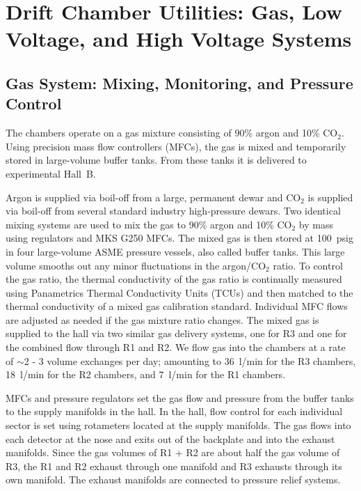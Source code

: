 \section{Drift Chamber Utilities: Gas, Low Voltage, and High Voltage Systems}
\label{utilities}

\subsection{Gas System: Mixing, Monitoring, and Pressure Control}

The chambers operate on a gas mixture consisting of 90\% argon and 10\% CO$_2$.
Using precision mass flow controllers (MFCs), the gas is mixed and temporarily
stored in large-volume buffer tanks.  From these tanks it is delivered to experimental Hall~B.  

Argon is supplied via boil-off from a large, permanent dewar and CO$_2$ is supplied 
via boil-off from several standard industry high-pressure dewars. Two identical mixing
systems are used to mix the gas to 90\% argon and 10\% CO$_2$ by mass using regulators and MKS G250 
MFCs. The mixed gas is then stored at 100~psig in four large-volume 
ASME pressure vessels, also called buffer tanks. This large volume smooths out 
any minor fluctuations in the argon/CO$_2$ ratio. To control the gas ratio, the thermal 
conductivity of the gas ratio is continually measured using Panametrics Thermal 
Conductivity Units (TCUs) and then matched to the thermal conductivity of a mixed 
gas calibration standard. Individual MFC flows are adjusted as needed if the gas mixture
ratio changes. The mixed gas is supplied to the hall via two similar gas delivery systems, 
one for R3 and one for the combined flow through R1 and R2. 
We flow gas into the chambers at a rate of $\sim$2 - 3 volume exchanges per day;
amounting to 36~l/min for the R3 chambers, 18~l/min for the R2 chambers, and 7~l/min
for the R1 chambers.

MFCs and pressure regulators set the gas flow and pressure from the 
buffer tanks to the supply manifolds in the hall. In the hall, flow control for each 
individual sector is set using rotameters located at the supply manifolds. The gas flows 
into each detector at the nose and exits out of the backplate and into the exhaust 
manifolds. Since the gas volumes of R1 + R2 are about half the gas volume of R3, the R1 and R2 exhaust 
through one manifold and R3 exhausts through its own manifold. The exhaust manifolds 
are connected to pressure relief systems. 

